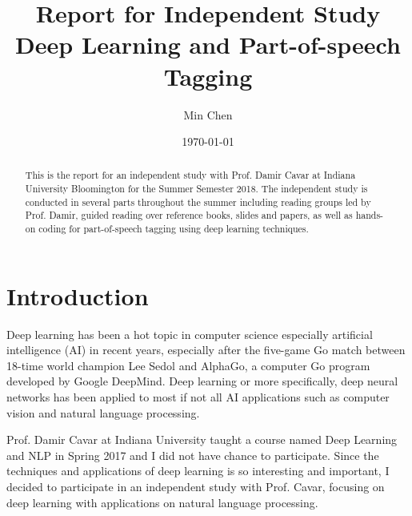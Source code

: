 \documentclass[11pt]{article}
\theoremstyle{plain}
\begin{document}
\title{Report for Independent Study\\
Deep Learning and Part-of-speech Tagging}
\author{Min Chen}
\date{\today}
\maketitle
\thispagestyle{fancy}

\begin{abstract}
	
This is the report for an independent study with Prof. Damir Cavar at Indiana 
University Bloomington for the Summer Semester 2018. The independent 
study is conducted in several parts throughout the summer including reading 
groups led by Prof. Damir, guided reading over reference books, slides and 
papers, as well as hands-on coding for part-of-speech tagging using deep 
learning techniques. 

\end{abstract}
\pagebreak
\tableofcontents
\pagebreak


\section{Introduction}

Deep learning has been a hot topic in computer science especially artificial 
intelligence (AI) in recent years, especially after the five-game Go match 
between 18-time world champion Lee Sedol and AlphaGo, a computer Go 
program developed by Google DeepMind. Deep learning or more specifically, 
deep neural networks has been applied to most if not all AI applications such 
as computer vision and natural language processing. 

Prof. Damir Cavar at Indiana University taught a course named Deep Learning 
and NLP in Spring 2017 and I did not have chance to participate. Since the 
techniques and applications of deep learning is so interesting and important, 
I decided to participate in an independent study with Prof. Cavar, focusing on 
deep learning with applications on natural language processing. 
\end{document}
